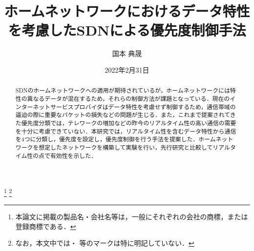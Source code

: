 \documentclass[a4paper,11pt,uplatex]{ujreport}
\title{ホームネットワークにおけるデータ特性を考慮したSDNによる優先度制御手法}  %
\author{国本 典晟}  %
\date{2022年2月31日}  %
\begin{document}
\maketitle
\clearpage

\begin{abstract}

  SDNのホームネットワークへの適用が期待されているが，ホームネットワークには特性の異なるデータが混在するため，それらの制御方法が課題となっている．現在のインターネットサービスプロバイダはデータ特性を考慮せず制御するため，通信帯域の逼迫の際に重要なパケットの損失などの問題が生じる．また，これまで提案されてきた優先度分類では，テレワークの増加などの昨今のリアルタイム性の高い通信の需要を十分に考慮できていない．本研究では，リアルタイム性を含むデータ特性から通信を4つに分類し，優先度を設定し，優先度制御を行う手法を提案した．ホームネットワークを想定したネットワークを構築して実験を行い，先行研究と比較してリアルタイム性の点で有効性を示した．

\end{abstract}


\footnote[0]{本論文に掲載の製品名・会社名等は，一般にそれぞれの会社の商標，または登録商標である．}
\footnote[0]{なお，本文中では\texttrademark ・ \textregistered 等のマークは特に明記していない．}


\setcounter{page}{0}
\end{document}
